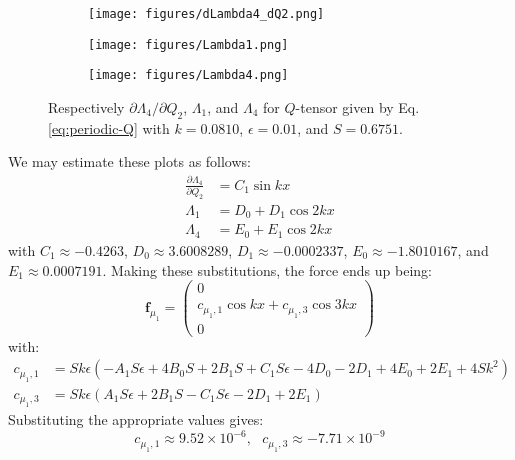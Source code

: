\documentclass[reqno]{article}
\begin{document}
\begin{figure}[h] 
  \centering
  \begin{subfigure}{0.45\textwidth}
    \texttt{[image: figures/dLambda4\_dQ2.png]}
    \caption{}
    \label{fig:dLambda4_dQ2}
  \end{subfigure}
  \hfill
  \begin{subfigure}{0.45\textwidth}
    \texttt{[image: figures/Lambda1.png]}
    \caption{}
    \label{fig:Lambda1}
  \end{subfigure}
  \hfill
  \begin{subfigure}{0.45\textwidth}
    \texttt{[image: figures/Lambda4.png]}
    \caption{}
    \label{fig:Lambda4}
  \end{subfigure}
  \caption{Respectively $\partial \Lambda_4 / \partial Q_2$, $\Lambda_1$, and
    $\Lambda_4$ for $Q$-tensor given by Eq. \eqref{eq:periodic-Q}
    with $k = 0.0810$, $\epsilon = 0.01$, and $S = 0.6751$.}
  \label{fig:dLambda_dx_new}
\end{figure}
We may estimate these plots as follows:
\begin{align}
  \frac{\partial \Lambda_4}{\partial Q_2} &= C_1 \sin kx \\
  \Lambda_1 &= D_0 + D_1 \cos 2kx \\
  \Lambda_4 &= E_0 + E_1 \cos 2kx
\end{align}
with $C_1 \approx -0.4263$, $D_0 \approx 3.6008289$, $D_1 \approx -0.0002337$, $E_0
\approx -1.8010167$, and $E_1 \approx 0.0007191$.
Making these substitutions, the force ends up being:
\begin{equation}
  \mathbf{f}_{\mu_1}
  =
  \begin{pmatrix}
    0 \\
    c_{\mu_1, 1} \cos kx + c_{\mu_1, 3} \cos 3kx \\
    0
  \end{pmatrix}
\end{equation}
with:
\begin{align}
  c_{\mu_1, 1}
  &=
    S k \epsilon \left(- A_{1} S \epsilon + 4 B_{0} S + 2 B_{1} S + C_{1} S \epsilon - 4 D_{0} - 2 D_{1} + 4 E_{0} + 2 E_{1} + 4 S k^{2}\right) \\
  c_{\mu_1, 3}
  &=
    S k \epsilon \left(A_{1} S \epsilon + 2 B_{1} S - C_{1} S \epsilon - 2 D_{1} + 2 E_{1}\right)
\end{align}
Substituting the appropriate values gives:
\begin{equation}
  c_{\mu_1, 1} \approx 9.52 \times 10^{-6}, \:\:\:
  c_{\mu_1, 3} \approx -7.71 \times 10^{-9}
\end{equation}
\end{document}
